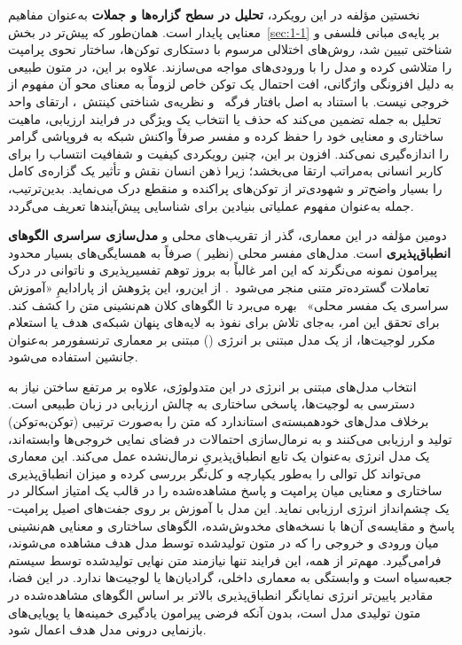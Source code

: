 نخستین مؤلفه در این رویکرد، \textbf{تحلیل در سطح گزاره‌ها و جملات} به‌عنوان مفاهیم معنایی پایدار است. همان‌طور که پیش‌تر در بخش~\ref{sec:1-1} بر پایه‌ی مبانی فلسفی و شناختی تبیین شد، روش‌های اختلالی مرسوم با دستکاری توکن‌ها، ساختار نحوی پرامپت را متلاشی کرده و مدل را با ورودی‌های  مواجه می‌سازند. علاوه بر این، در متون طبیعی به دلیل افزونگی واژگانی، افت احتمال یک توکن خاص لزوماً به معنای محو آن مفهوم از خروجی نیست. با استناد به اصل بافتار فرگه~\cite{frege1991foundations} و نظریه‌ی شناختی کینتش~\cite{kintsch1998comprehension}، ارتقای واحد تحلیل به جمله تضمین می‌کند که حذف یا انتخاب یک ویژگی در فرایند ارزیابی، ماهیت ساختاری و معنایی خود را حفظ کرده و مفسر صرفاً واکنش شبکه به فروپاشی گرامر را اندازه‌گیری نمی‌کند. افزون بر این، چنین رویکردی کیفیت و شفافیت انتساب را برای کاربر انسانی به‌مراتب ارتقا می‌بخشد؛ زیرا ذهن انسان نقش و تأثیر یک گزاره‌ی کامل را بسیار واضح‌تر و شهودی‌تر از توکن‌های پراکنده و منقطع درک می‌نماید. بدین‌ترتیب، جمله به‌عنوان مفهوم عملیاتی بنیادین برای شناسایی پیش‌آیندها تعریف می‌گردد.

دومین مؤلفه در این معماری، گذر از تقریب‌های محلی و \textbf{مدل‌سازی سراسری الگوهای انطباق‌پذیری} است. مدل‌های مفسر محلی (نظیر ) صرفاً به همسایگی‌های بسیار محدود پیرامون نمونه می‌نگرند که این امر غالباً به بروز توهم تفسیرپذیری و ناتوانی در درک تعاملات گسترده‌تر متنی منجر می‌شود~\cite{friedman2024interpretability}. از این‌رو، این پژوهش از پارادایمِ «آموزش سراسری یک مفسر محلی»~\cite{chen2018learning} بهره می‌برد تا الگوهای کلان هم‌نشینی متن را کشف کند. برای تحقق این امر، به‌جای تلاش برای نفوذ به لایه‌های پنهان شبکه‌ی هدف یا استعلام مکرر لوجیت‌ها، از یک مدل مبتنی بر انرژی () مبتنی بر معماری ترنسفورمر به‌عنوان جانشین استفاده می‌شود.

انتخاب مدل‌های مبتنی بر انرژی در این متدولوژی، علاوه بر مرتفع ساختن نیاز به دسترسی به لوجیت‌ها، پاسخی ساختاری به چالش ارزیابی در زبان طبیعی است. برخلاف مدل‌های خودهمبسته‌ی استاندارد که متن را به‌صورت ترتیبی (توکن‌به‌توکن) تولید و ارزیابی می‌کنند و به نرمال‌سازی احتمالات در فضای نمایی خروجی‌ها وابسته‌اند، یک مدل انرژی به‌عنوان یک تابع انطباق‌پذیریِ نرمال‌نشده عمل می‌کند. این معماری می‌تواند کل توالی را به‌طور یکپارچه و کل‌نگر بررسی کرده و میزان انطباق‌پذیری ساختاری و معنایی میان پرامپت و پاسخ مشاهده‌شده را در قالب یک امتیاز اسکالر در یک چشم‌انداز انرژی ارزیابی نماید. این مدل با آموزش بر روی جفت‌های اصیل پرامپت-پاسخ و مقایسه‌ی آن‌ها با نسخه‌های مخدوش‌شده، الگوهای ساختاری و معنایی هم‌نشینی میان ورودی و خروجی را که در متون تولیدشده توسط مدل هدف مشاهده می‌شوند، فرامی‌گیرد. مهم‌تر از همه، این فرایند تنها نیازمند متن نهایی تولیدشده توسط سیستم جعبه‌سیاه است و وابستگی به معماری داخلی، گرادیان‌ها یا لوجیت‌ها ندارد. در این فضا، مقادیر پایین‌تر انرژی نمایانگر انطباق‌پذیری بالاتر بر اساس الگوهای مشاهده‌شده در متون تولیدی مدل است، بدون آنکه فرضی پیرامون یادگیری خمینه‌ها یا پویایی‌های بازنمایی درونی مدل هدف اعمال شود.


